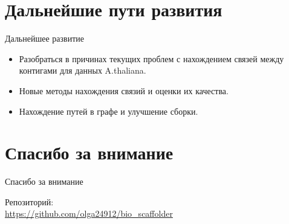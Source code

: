 \documentclass{beamer}
\newcommand{\cimg}[2]{%
	\begin{center}%
		\ifthenelse{\equal{#2}{}}{%
			\texttt{[image: \#1]}
		}{%
			\texttt{[image: \#1]}
		}%
	\end{center}%
}
\begin{document}
\section{Дальнейшие пути развития}
\begin{frame}[t]{Дальнейшее развитие}
\begin{itemize}
\item Разобраться в причинах текущих 
проблем с нахождением связей между 
контигами для данных A.thaliana.  
\cimg{athaliana.jpg}{0.20}
\item %
Новые методы нахождения связий и оценки их качества. 
\item Нахождение путей в графе и улучшение сборки. 
\end{itemize}
\end{frame}

\section{Спасибо за внимание}
\begin{frame}{Спасибо за внимание}
    \begin{center}
        Репозиторий: \\ \url{https://github.com/olga24912/bio_scaffolder}
    \end{center}
\end{frame}
\end{document}
